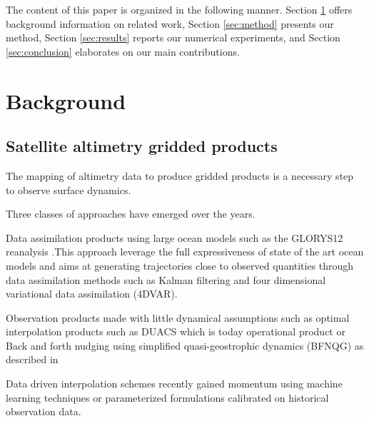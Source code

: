 \documentclass[draft]{agujournal2019}
\begin{document}
    
The content of this paper is organized in the following manner. Section \ref{sec:background} offers background information on related work, Section \ref{sec:method} presents our method, Section \ref{sec:results} reports our numerical experiments, and Section \ref{sec:conclusion} elaborates on our main contributions.


\section{Background}
\label{sec:background}
\subsection{Satellite altimetry gridded products}
\label{ssec:interpolation}
The mapping of altimetry data to produce gridded products is a necessary step to observe surface dynamics.

Three classes of approaches have emerged over the years. 

Data assimilation products using large ocean models such as the GLORYS12 reanalysis \cite{jean-michelCopernicusGlobal122021}.This approach leverage the full expressiveness of state of the art ocean models and aims at generating trajectories close to observed quantities through data assimilation methods such as Kalman filtering\cite{} and four dimensional variational data assimilation (4DVAR)\cite{carrassiDataAssimilationGeosciences2018}.

Observation products made with little dynamical assumptions such as optimal interpolation products such as DUACS which is today operational product \cite{taburetDUACSDT2018252019} or Back and forth nudging using simplified quasi-geostrophic dynamics (BFNQG) as described in \cite{guillouMappingAltimetryForthcoming2021}

Data driven interpolation schemes recently gained momentum using machine learning techniques or parameterized formulations calibrated on historical observation data.\cite{alveraazcarateReconstructionIncompleteOceanographic2005,fabletENDTOENDPHYSICSINFORMEDREPRESENTATION2021,ubelmannReconstructingOceanSurface2021}


\end{document}
